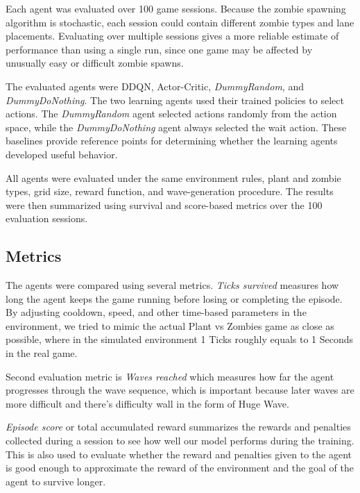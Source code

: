 \documentclass[conference,onecolumn]{IEEEtran}
\begin{document}
Each agent was evaluated over 100 game sessions. Because the zombie spawning algorithm is stochastic, each session could contain different zombie types and lane placements. Evaluating over multiple sessions gives a more reliable estimate of performance than using a single run, since one game may be affected by unusually easy or difficult zombie spawns.

The evaluated agents were DDQN, Actor-Critic, \textit{DummyRandom}, and \textit{DummyDoNothing}. The two learning agents used their trained policies to select actions. The \textit{DummyRandom} agent selected actions randomly from the action space, while the \textit{DummyDoNothing} agent always selected the wait action. These baselines provide reference points for determining whether the learning agents developed useful behavior.

All agents were evaluated under the same environment rules, plant and zombie types, grid size, reward function, and wave-generation procedure. The results were then summarized using survival and score-based metrics over the 100 evaluation sessions.


\subsection{Metrics}
The agents were compared using several metrics. \textit{Ticks survived} measures how long the agent keeps the game running before losing or completing the episode. By adjusting cooldown, speed, and other time-based parameters in the environment, we tried to mimic the actual Plant vs Zombies game as close as possible, where in the simulated environment 1 Ticks roughly equals to 1 Seconds in the real game. 

Second evaluation metric is \textit{Waves reached} which measures how far the agent progresses through the wave sequence, which is important because later waves are more difficult and there's difficulty wall in the form of Huge Wave.

\textit{Episode score} or total accumulated reward summarizes the rewards and penalties collected during a session to see how well our model performs during the training. This is also used to evaluate whether the reward and penalties given to the agent is good enough to approximate the reward of the environment and the goal of the agent to survive longer. 

\end{document}
